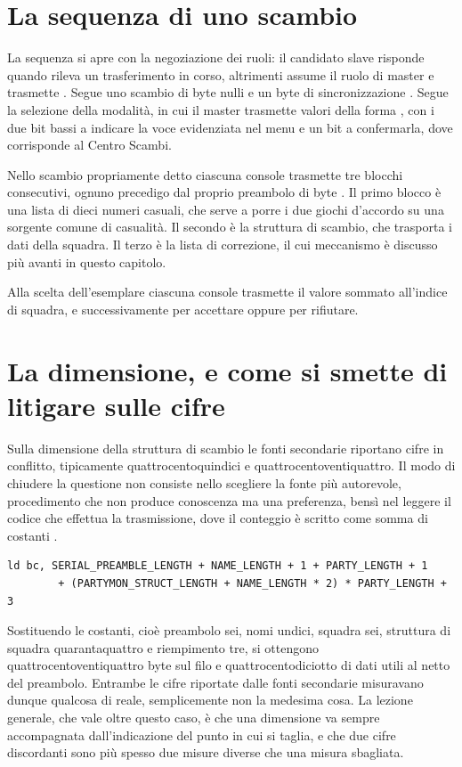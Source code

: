 \section{La sequenza di uno scambio}

La sequenza si apre con la negoziazione dei ruoli: il candidato slave risponde  quando rileva un trasferimento in corso, altrimenti assume il ruolo di master e trasmette . Segue uno scambio di byte nulli e un byte di sincronizzazione . Segue la selezione della modalità, in cui il master trasmette valori della forma , con i due bit bassi a indicare la voce evidenziata nel menu e un bit a confermarla, dove  corrisponde al Centro Scambi.

Nello scambio propriamente detto ciascuna console trasmette tre blocchi consecutivi, ognuno precedigo dal proprio preambolo di byte . Il primo blocco è una lista di dieci numeri casuali, che serve a porre i due giochi d'accordo su una sorgente comune di casualità. Il secondo è la struttura di scambio, che trasporta i dati della squadra. Il terzo è la lista di correzione, il cui meccanismo è discusso più avanti in questo capitolo.

Alla scelta dell'esemplare ciascuna console trasmette il valore  sommato all'indice di squadra, e successivamente  per accettare oppure  per rifiutare.

\section{La dimensione, e come si smette di litigare sulle cifre}

Sulla dimensione della struttura di scambio le fonti secondarie riportano cifre in conflitto, tipicamente quattrocentoquindici e quattrocentoventiquattro. Il modo di chiudere la questione non consiste nello scegliere la fonte più autorevole, procedimento che non produce conoscenza ma una preferenza, bensì nel leggere il codice che effettua la trasmissione, dove il conteggio è scritto come somma di costanti \cite{pokered}.

\begin{verbatim}
ld bc, SERIAL_PREAMBLE_LENGTH + NAME_LENGTH + 1 + PARTY_LENGTH + 1
        + (PARTYMON_STRUCT_LENGTH + NAME_LENGTH * 2) * PARTY_LENGTH + 3
\end{verbatim}

Sostituendo le costanti, cioè preambolo sei, nomi undici, squadra sei, struttura di squadra quarantaquattro e riempimento tre, si ottengono quattrocentoventiquattro byte sul filo e quattrocentodiciotto di dati utili al netto del preambolo. Entrambe le cifre riportate dalle fonti secondarie misuravano dunque qualcosa di reale, semplicemente non la medesima cosa. La lezione generale, che vale oltre questo caso, è che una dimensione va sempre accompagnata dall'indicazione del punto in cui si taglia, e che due cifre discordanti sono più spesso due misure diverse che una misura sbagliata.

